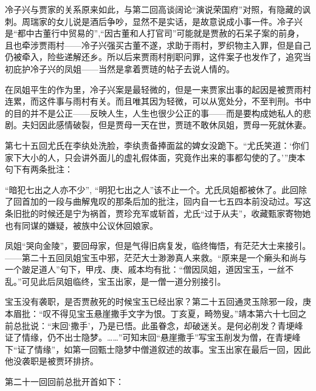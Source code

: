 \par 冷子兴与贾家的关系原来如此，与第二回高谈阔论“演说荣国府”对照，有隐藏的讽刺。周瑞家的女儿说是酒后争吵，显然不是实话，是故意说成小事一件。冷子兴是“都中古董行中贸易的”,“因古董和人打官司”可能就是贾赦的石呆子案的前身，且也牵涉贾雨村——冷子兴强买古董不遂，求助于雨村，罗织物主入罪，但是自己仍被牵入，险些递解还乡。所以后来贾雨村削职问罪，这件案子也发作了，追究当初庇护冷子兴的凤姐——当然是拿着贾琏的帖子去说人情的。
\par 在凤姐平生的作为里，冷子兴案是最轻微的，但是一来贾家出事的起因是被贾雨村连累，而这件事与雨村有关。而且唯其因为轻微，可以从宽处分，不至判刑。书中的目的并不是公正——反映人生，人生也很少公正的事——而是要构成她私人的悲剧。夫妇因此感情破裂，但是贾母一天在世，贾琏不敢休凤姐，贾母一死就休妻。
\par 第七十五回尤氏在李纨处洗脸，李纨责备捧面盆的婢女没跪下。“尤氏笑道：‘你们家下大小的人，只会讲外面儿的虚礼假体面，究竟作出来的事都勾使的了。'”庚本句下有两条批注：
\par “暗犯七出之人亦不少”, “明犯七出之人”该不止一个。尤氏凤姐都被休了。此回除了回首加的一段与曲解鬼叹的那条后加的批注，回内自一七五四本前没动过。写这条旧批的时候还是宁为祸首，贾珍充军或斩首，尤氏“过于从夫”，收藏甄家寄物她也有同谋的嫌疑，被族中公议休回娘家。
\par 凤姐“哭向金陵”，要回母家，但是气得旧病复发，临终悔悟，有茫茫大士来接引。——第二十五回凤姐宝玉中邪，茫茫大士渺渺真人来救。“原来是一个癞头和尚与一个跛足道人”句下，甲戌、庚、戚本均有批：“僧因凤姐，道因宝玉，一丝不乱。”可见此后凤姐临终，宝玉出家，是一僧一道分别接引。
\par 宝玉没有袭职，是否贾赦死的时候宝玉已经出家？第二十五回通灵玉除邪一段，庚本眉批：“叹不得见宝玉悬崖撒手文字为恨。丁亥夏，畸笏叟。”靖本第六十七回之前总批说：“末回‘撒手’，乃是已悟。此虽眷念，却破迷关。是何必削发？青埂峰证了情缘，仍不出士隐梦。……”可知末回“悬崖撒手”写宝玉削发为僧，在青埂峰下“证了情缘”，如第一回甄士隐梦中僧道叙述的故事。宝玉出家在最后一回，因此他没袭职是被贾环排挤。
\par 第二十一回回前总批开首如下：
